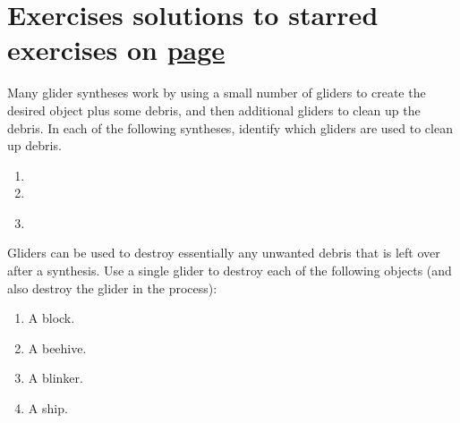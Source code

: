 \section*{Exercises \hfill \normalfont\textsf{\small solutions to starred exercises on \hyperlink{solutions_glider_synthesis}{page \pageref{solutions_glider_synthesis}}}}
\label{sec:synthesis_exercises}
\vspace*{-0.4cm}\hrulefill\vspace*{-0.3cm}\footnotesize\begin{multicols}{2}\vspace*{-0.4cm}\raggedcolumns{}
	\setlength{\parskip}{0pt}
	
	\begin{problem}\label{exer:glider_cleanup} 
		Many glider syntheses work by using a small number of gliders to create the desired object plus some debris, and then additional gliders to clean up the debris. In each of the following syntheses, identify which gliders are used to clean up debris.
		\begin{enumerate}[label=\bf\color{ocre}(\alph*)]
			\item {}
			\item {}
			\item {}\\
		\end{enumerate}
	\end{problem}
	
	
	\mfilbreak
	
	
	\begin{problemstar}\label{exer:single_glider_cleanup} 
		Gliders can be used to destroy essentially any unwanted debris that is left over after a synthesis. Use a single glider to destroy each of the following objects (and also destroy the glider in the process):
		\begin{enumerate}[label=\bf\color{ocre}(\alph*)]
			\item A block.
			
			\item A beehive.
			
			\item A blinker.
			
			\item A ship.
			

\end{enumerate}
\end{problemstar}
\end{multicols}
